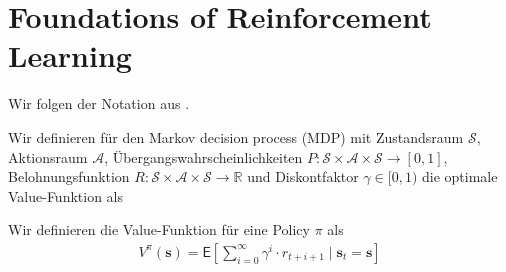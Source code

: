 
\usepackage[backend=biber,style=numeric]{biblatex}

\usepackage{listings}





\section{Foundations of Reinforcement Learning}

Wir folgen der Notation aus \cite{Plaat_RL}.
\begin{definition}
    Wir definieren für den Markov decision process (MDP) mit 
    Zustandsraum $\mathcal{S}$, 
    Aktionsraum $\mathcal{A}$, 
    Übergangswahrscheinlichkeiten $P:\mathcal{S} \times \mathcal{A} \times \mathcal{S} \to [0,1]$, 
    Belohnungsfunktion $R:\mathcal{S} \times \mathcal{A} \times \mathcal{S} \to \mathbb{R}$ 
    und Diskontfaktor $\gamma \in [0,1)$ die optimale Value-Funktion als
\end{definition}

\begin{definition}
    Wir definieren die Value-Funktion für eine Policy $\pi$ als
    \begin{align*}
        V^{\pi}(\bm{s}) 
        = \mathsf{E} 
        \left[
            \sum_{i=0}^{\infty} \gamma^i \cdot r_{t+i+1} \mid \bm{s}_t = \bm{s}
        \right]
    \end{align*}
\end{definition}

